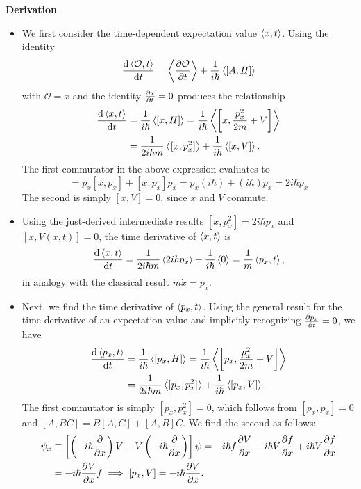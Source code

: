 \documentclass[11pt, a4paper]{article}
\renewcommand{\O}{\mathcal{O}}  %
\newcommand{\p}{\psi}  %
\begin{document}
\vspace{2mm}
\textbf{Derivation}
\begin{itemize}
    \item We first consider the time-dependent expectation value $ \ev{x, t} $. Using the identity
	\begin{equation*}
		\dv{\ev{\O, t}}{t} =  \ev{\pdv{\O}{t}} + \frac{1}{i\hbar}\ev{[A, H]}
	\end{equation*}
	with $ \O = x $ and the identity $ \pdv{x}{t} = 0 $ produces the relationship
	\begin{align*}
		\dv{\ev{x, t}}{t} &= \frac{1}{i\hbar}\ev{[x, H]} = \frac{1}{i\hbar}\ev{\left[x, \frac{p_{x}^{2}}{2m} + V\right]}\\
		& = \frac{1}{2i\hbar m} \ev{[x, p_{x}^{2}]} + \frac{1}{i\hbar}\ev{[x, V]}.
	\end{align*}
	The first commutator in the above expression evaluates to
	\begin{equation*}
		[x, p_{x}^{2}] = p_{x}[x, p_{x}] + [x, p_{x}]p_{x} = p_{x}(i\hbar) + (i\hbar) p_{x} = 2i \hbar p_{x} 
	\end{equation*}
	The second is simply $ [x, V] = 0 $, since $ x $ and $ V $ commute. 
	
	\item Using the just-derived intermediate results $ [x, p_{x}^{2}] = 2i\hbar p_{x} $ and $ [x, V(x, t)] = 0 $, the time derivative of $ \ev{x, t} $ is 
	\begin{equation*}
		\dv{\ev{x, t}}{t} = \frac{1}{2i\hbar m} \ev{2 i\hbar p_{x}} + \frac{1}{i\hbar}\ev{0} = \frac{1}{m}\ev{p_{x}, t},
	\end{equation*}
	in analogy with the classical result $ m \dot{x} = p_{x} $. 
	
	\item Next, we find the time derivative of $ \ev{p_{x}, t} $. Using the general result for the time derivative of an expectation value and implicitly recognizing $ \pdv{p_{x}}{t} = 0 $, we have
	\begin{align*}
		\dv{\ev{p_{x}, t}}{t} &= \frac{1}{i\hbar}\ev{[p_{x}, H]} = \frac{1}{i\hbar}\ev{\left[p_{x}, \frac{p_{x}^{2}}{2m} + V\right]}\\
		&= \frac{1}{2i \hbar m}\ev{[p_{x}, p_{x}^{2}]} + \frac{1}{i\hbar} \ev{[p_{x}, V]}.
	\end{align*}
	The first commutator is simply $ [p_{x}, p_{x}^{2}] = 0 $, which follows from $ [p_{x}, p_{x}] = 0 $ and $ [A, BC] = B[A, C] + [A, B]C $. We find the second as follows:
	\begin{align*}
		[p_{x}, V]\p_{x} &\equiv \left[ \left(-i\hbar \pdv{x}\right) V - V\left(-i\hbar \pdv{x}\right) \right] \p = - i \hbar f \pdv{V}{x} - i \hbar V \pdv{f}{x} + i \hbar V \pdv{f}{x} \\
		& =  - i \hbar \pdv{V}{x}f \implies [p_{x}, V] = - i \hbar \pdv{V}{x}.
	\end{align*}
	

\end{itemize}
\end{document}
